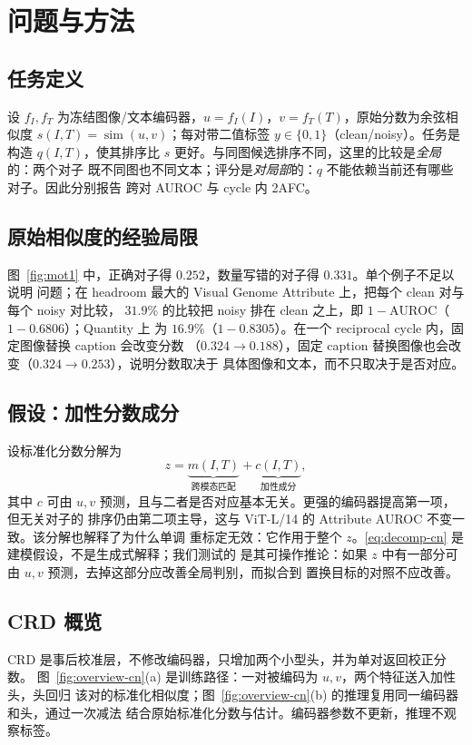 \documentclass[10pt,twocolumn,a4paper]{ctexart}
\begin{document}
\section{问题与方法}
\label{sec:problem-cn}

\subsection{任务定义}
设 $f_I,f_T$ 为冻结图像/文本编码器，$u=f_I(I)$，$v=f_T(T)$，原始分数为余弦相似度
$s(I,T)=\operatorname{sim}(u,v)$；每对带二值标签 $y\in\{0,1\}$（clean/noisy）。任务是构造
$q(I,T)$，使其排序比 $s$ 更好。与同图候选排序不同，这里的比较是\emph{全局}的：两个对子
既不同图也不同文本；评分是\emph{对局部}的：$q$ 不能依赖当前还有哪些对子。因此分别报告
跨对 AUROC 与 cycle 内 2AFC。

\subsection{原始相似度的经验局限}
图~\ref{fig:mot1} 中，正确对子得 $0.252$，数量写错的对子得 $0.331$。单个例子不足以说明
问题；在 headroom 最大的 Visual Genome Attribute 上，把每个 clean 对与每个 noisy 对比较，
$31.9\%$ 的比较把 noisy 排在 clean 之上，即 $1-\mathrm{AUROC}$（$1-0.6806$）；Quantity 上
为 $16.9\%$（$1-0.8305$）。在一个 reciprocal cycle 内，固定图像替换 caption 会改变分数
（$0.324\to0.188$），固定 caption 替换图像也会改变（$0.324\to0.253$），说明分数取决于
具体图像和文本，而不只取决于是否对应。

\subsection{假设：加性分数成分}
设标准化分数分解为
\begin{equation}
  z=\underbrace{m(I,T)}_{\text{跨模态匹配}}+\underbrace{c(I,T)}_{\text{加性成分}},
  \label{eq:decomp-cn}
\end{equation}
其中 $c$ 可由 $u,v$ 预测，且与二者是否对应基本无关。更强的编码器提高第一项，但无关对子的
排序仍由第二项主导，这与 ViT-L/14 的 Attribute AUROC 不变一致。该分解也解释了为什么单调
重标定无效：它作用于整个 $z$。\eqref{eq:decomp-cn} 是建模假设，不是生成式解释；我们测试的
是其可操作推论：如果 $z$ 中有一部分可由 $u,v$ 预测，去掉这部分应改善全局判别，而拟合到
置换目标的对照不应改善。

\subsection{CRD 概览}
\label{sec:method-cn}
CRD 是事后校准层，不修改编码器，只增加两个小型头，并为单对返回校正分数。
图~\ref{fig:overview-cn}(a) 是训练路径：一对被编码为 $u,v$，两个特征送入加性头，头回归
该对的标准化相似度；图~\ref{fig:overview-cn}(b) 的推理复用同一编码器和头，通过一次减法
结合原始标准化分数与估计。编码器参数不更新，推理不观察标签。
\end{document}
